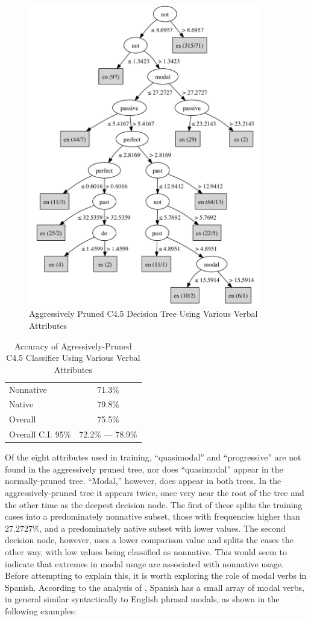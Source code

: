 \documentclass[main.tex]{subfiles}
\begin{document}
\begin{figure}[htbp]
\centering
\includegraphics[width=4in]{pruned-basic-verb-tree.pdf}
\caption{Aggressively Pruned C4.5 Decision Tree Using Various Verbal Attributes}
\label{fig:pruned-basic-verb-tree}
\end{figure}
\begin{table}[htbp]
\centering
\caption{Accuracy of Agressively-Pruned C4.5 Classifier Using Various Verbal Attributes}
\begin{tabular}{l c}
\toprule
Nonnative & 71.3\% \\
Native & 79.8\% \\
Overall & 75.5\% \\
Overall C.I. 95\% & 72.2\% --- 78.9\%\\
\bottomrule
\end{tabular}
\label{table:pruned-basic-verb-results}
\end{table}
Of the eight attributes used in training, ``quasimodal'' and ``progressive'' are not found in the aggressively pruned tree, nor does ``quasimodal'' appear in the normally-pruned tree. ``Modal,'' however, does appear in both trees. In the aggressively-pruned tree it appears twice, once very near the root of the tree and the other time as the deepest decision node. The first of these splits the training cases into a predominately nonnative subset, those with frequencies higher than 27.2727\%, and a predominately native subset with lower values. The second decision node, however, uses a lower comparison value and splits the cases the other way, with low values being classified as nonnative. This would seem to indicate that extremes in modal usage are associated with nonnative usage. Before attempting to explain this, it is worth exploring the role of modal verbs in Spanish. According to the analysis of \citet{butt}, Spanish has a small array of modal verbs, in general similar syntactically to English phrasal modals, as shown in the following examples:
\end{document}
